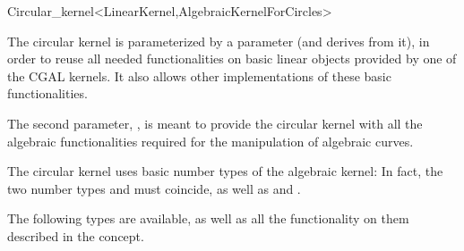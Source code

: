 \begin{ccRefClass}{Circular_kernel<LinearKernel,AlgebraicKernelForCircles>}

\ccDefinition


\ccIsModel


\ccParameters

The circular kernel is parameterized by a  parameter
(and derives from it), in order to reuse all needed functionalities on
basic linear objects provided by one of the CGAL kernels. It also
allows other implementations of these basic functionalities.

The second parameter, , is meant to provide the
circular kernel with all the algebraic functionalities required for the
manipulation of algebraic curves. 

\ccInheritsFrom


\ccTypes

\ccThreeToTwo

The circular kernel uses basic number types of the algebraic kernel:
In fact, the two number types  and
 must coincide, as well as
 and .

The following types are available, as well as all the functionality on
them described in the  concept. 

\ccGlue
{}
\ccGlue
{}

\ccSeeAlso

\\

\end{ccRefClass}
